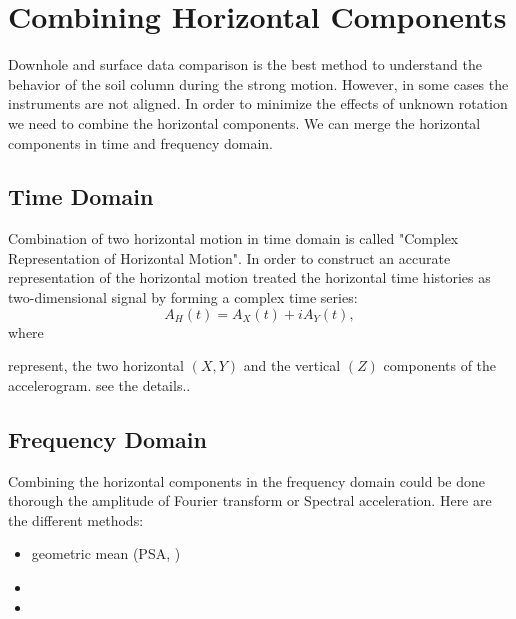 \newpage
\section{Combining Horizontal Components}
Downhole and surface data comparison is the best method to understand the behavior of the soil column during the strong motion. However, in some cases the instruments are not aligned. In order to minimize the effects of unknown rotation we need to combine the horizontal components. We can merge the horizontal components in time and frequency domain.\\

\subsection{Time Domain}

Combination of two horizontal motion in time domain is called "Complex Representation of Horizontal Motion". In order to construct an accurate representation of the horizontal motion \citet{Steidl1996} treated the horizontal time histories as two-dimensional signal by forming a complex time series: 
\begin{equation}
A_H(t) = A_X(t) + iA_Y(t),
\end{equation}
where
\begin{equation}
[A_X(t),A_Y(t),A_Z(t)]
\end{equation}

represent, the two horizontal $(X,Y)$ and the vertical $(Z)$ components of the accelerogram. {\color{red} see the details.}.

\subsection{Frequency Domain}

Combining the horizontal components in the frequency domain could be done thorough the amplitude of Fourier transform or Spectral acceleration.  Here are the different methods:

\begin{itemize}
\item geometric mean (PSA, \citet{Kaklamanos2013}) 
\item
\item
\end{itemize}
